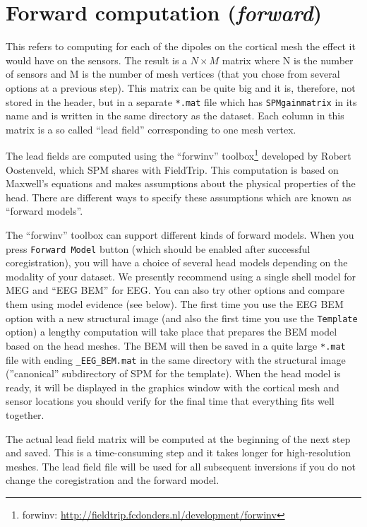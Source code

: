 \section{Forward computation (\textit{forward})}
This refers to computing for each of the dipoles on the cortical mesh the effect it would have on the sensors. The result is a $N \times M$ matrix where N is the number of sensors and M is the number of mesh vertices (that you chose from several options at a previous step). This matrix can be quite big and it is, therefore, not stored in the header, but in a separate \texttt{*.mat} file which has \texttt{SPMgainmatrix} in its name and is written in the same directory as the dataset. Each column in this matrix is a so called ``lead field'' corresponding to one mesh vertex.

The lead fields are computed using the ``forwinv'' toolbox\footnote{forwinv: \url{http://fieldtrip.fcdonders.nl/development/forwinv}} developed by Robert Oostenveld, which SPM shares with FieldTrip. This computation is based on Maxwell's equations and makes assumptions about the physical properties of the head. There are different ways to specify these assumptions which are known as ``forward models''.

The ``forwinv'' toolbox can support different kinds of forward models. When you press \texttt{Forward Model} button (which should be enabled after successful coregistration), you will have a choice of several head models depending on the modality of your dataset. We presently recommend using a single shell model for MEG and ``EEG BEM'' for EEG. You can also try other options and compare them using model evidence (see below). The first time you use the EEG BEM option with a new structural image (and also the first time you use the \texttt{Template} option) a lengthy computation will take place that prepares the BEM model based on the head meshes. The BEM will then be saved in a quite large \texttt{*.mat} file with ending \texttt{\_EEG\_BEM.mat} in the same directory with the structural image (''canonical'' subdirectory of SPM for the template). When the head model is ready, it will be displayed in the graphics window with the cortical mesh and sensor locations you should verify for the final time that everything fits well together.

The actual lead field matrix will be computed at the beginning of the next step and saved. This is a time-consuming step and it takes longer for high-resolution meshes. The lead field file will be used for all subsequent inversions if you do not change the coregistration and the forward model.


